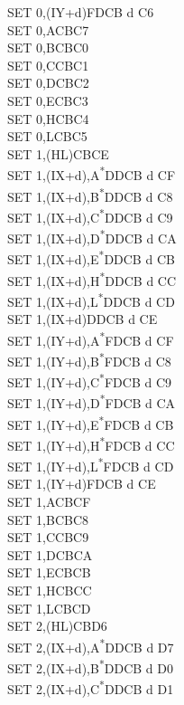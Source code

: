 \documentclass[twoside,openright,a4paper]{book}
\begin{document}
\begin{multicols}{3}
{\begin{tabbing}
	SET 0,(IY+d)\>FDCB d C6\\
	SET 0,A\>CBC7\\
	SET 0,B\>CBC0\\
	SET 0,C\>CBC1\\
	SET 0,D\>CBC2\\
	SET 0,E\>CBC3\\
	SET 0,H\>CBC4\\
	SET 0,L\>CBC5\\
	SET 1,(HL)\>CBCE\\
	SET 1,(IX+d),A\textsuperscript{*}\>DDCB d CF\\
	SET 1,(IX+d),B\textsuperscript{*}\>DDCB d C8\\
	SET 1,(IX+d),C\textsuperscript{*}\>DDCB d C9\\
	SET 1,(IX+d),D\textsuperscript{*}\>DDCB d CA\\
	SET 1,(IX+d),E\textsuperscript{*}\>DDCB d CB\\
	SET 1,(IX+d),H\textsuperscript{*}\>DDCB d CC\\
	SET 1,(IX+d),L\textsuperscript{*}\>DDCB d CD\\
	SET 1,(IX+d)\>DDCB d CE\\
	SET 1,(IY+d),A\textsuperscript{*}\>FDCB d CF\\
	SET 1,(IY+d),B\textsuperscript{*}\>FDCB d C8\\
	SET 1,(IY+d),C\textsuperscript{*}\>FDCB d C9\\
	SET 1,(IY+d),D\textsuperscript{*}\>FDCB d CA\\
	SET 1,(IY+d),E\textsuperscript{*}\>FDCB d CB\\
	SET 1,(IY+d),H\textsuperscript{*}\>FDCB d CC\\
	SET 1,(IY+d),L\textsuperscript{*}\>FDCB d CD\\
	SET 1,(IY+d)\>FDCB d CE\\
	SET 1,A\>CBCF\\
	SET 1,B\>CBC8\\
	SET 1,C\>CBC9\\
	SET 1,D\>CBCA\\
	SET 1,E\>CBCB\\
	SET 1,H\>CBCC\\
	SET 1,L\>CBCD\\
	SET 2,(HL)\>CBD6\\
	SET 2,(IX+d),A\textsuperscript{*}\>DDCB d D7\\
	SET 2,(IX+d),B\textsuperscript{*}\>DDCB d D0\\
	SET 2,(IX+d),C\textsuperscript{*}\>DDCB d D1\\

\end{tabbing}}
\end{multicols}
\end{document}
